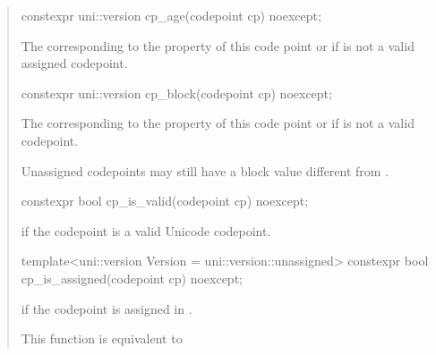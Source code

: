 \documentclass{wg21}
\begin{document}
\begin{quote}
\begin{itemdecl}
constexpr uni::version cp_age(codepoint cp) noexcept;
\end{itemdecl}

\begin{itemdescr}

\returns The  corresponding to the  property of this code point or  if  is not a valid assigned codepoint.

\end{itemdescr}


\begin{itemdecl}
constexpr uni::version cp_block(codepoint cp) noexcept;
\end{itemdecl}

\begin{itemdescr}

\returns The  corresponding to the  property of this code point or  if  is not a valid codepoint.

\begin{note}
Unassigned codepoints may still have a block value different from .
\end{note}


\end{itemdescr}


\begin{itemdecl}
constexpr bool cp_is_valid(codepoint cp) noexcept;
\end{itemdecl}

\begin{itemdescr}

\returns {} if the codepoint  is a valid Unicode codepoint.

\end{itemdescr}

\begin{itemdecl}
template<uni::version Version = uni::version::unassigned>
constexpr bool cp_is_assigned(codepoint cp) noexcept;
\end{itemdecl}

\begin{itemdescr}

\returns {} if the codepoint  is assigned in .

\begin{note}
This function is equivalent to 
\end{note}


\end{itemdescr}
\end{quote}
\end{document}
